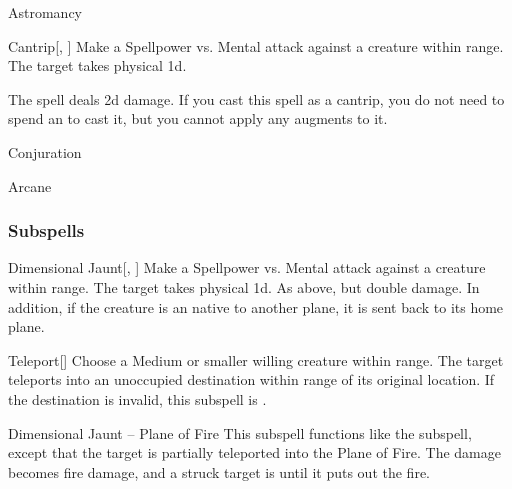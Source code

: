 \newpage
\begin{spellsection}{Astromancy}

\begin{spellheader}
\end{spellheader}


\begin{ability}{Cantrip}[, ]
Make a Spellpower vs. Mental attack against a creature within \rngmed range.
\hit The target takes physical  \minus1d.
\end{ability}



 The spell deals \minus2d damage. If you cast this spell as a cantrip,
you do not need to spend an  to cast it,
but you cannot apply any augments to it.


 Conjuration

 Arcane
\end{spellsection}


\subsubsection{Subspells}


\begin{ability}[\nth{1}]{Dimensional Jaunt}[, ]
Make a Spellpower vs. Mental attack against a creature within \rngmed range.
\hit The target takes physical  \plus1d.
\crit As above, but double damage.
In addition, if the creature is an  native to another plane, it is sent back to its home plane.
\end{ability}
\vspace{0.25em}


\begin{ability}[\nth{1}]{Teleport}[]
Choose a Medium or smaller willing creature within \rngclose range.
The target teleports into an unoccupied destination within \rngmed range of its original location.
If the destination is invalid, this subspell is .
\end{ability}
\vspace{0.25em}


\begin{ability}[\nth{2}]{Dimensional Jaunt -- Plane of Fire}
This subspell functions like the  subspell, except that the target is partially teleported into the Plane of Fire.
The damage becomes fire damage, and a struck target is  until it puts out the fire.
\end{ability}
\vspace{0.25em}


